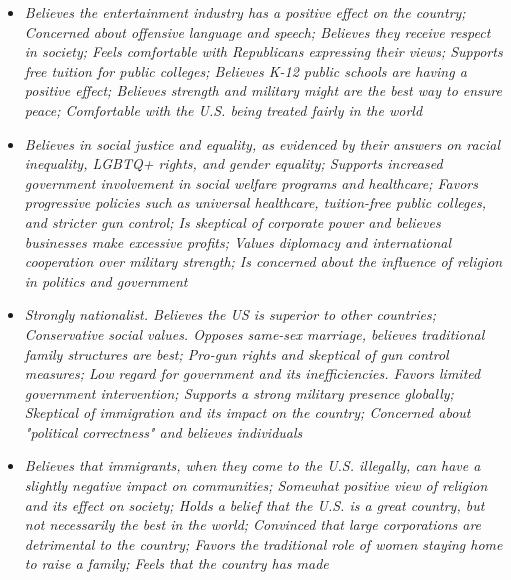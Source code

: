 \documentclass[11pt]{article}
\newcommand{\profiletext}[1]{\textit{#1}}
\begin{document}
\begin{itemize}
\item \profiletext{Believes the entertainment industry has a positive effect on the country; Concerned about offensive language and speech; Believes they receive respect in society; Feels comfortable with Republicans expressing their views; Supports free tuition for public colleges; Believes K-12 public schools are having a positive effect; Believes strength and military might are the best way to ensure peace; Comfortable with the U.S. being treated fairly in the world}
\item \profiletext{Believes in social justice and equality, as evidenced by their answers on racial inequality, LGBTQ+ rights, and gender equality; Supports increased government involvement in social welfare programs and healthcare; Favors progressive policies such as universal healthcare, tuition-free public colleges, and stricter gun control; Is skeptical of corporate power and believes businesses make excessive profits; Values diplomacy and international cooperation over military strength; Is concerned about the influence of religion in politics and government}
\item \profiletext{Strongly nationalist. Believes the US is superior to other countries; Conservative social values. Opposes same-sex marriage, believes traditional family structures are best; Pro-gun rights and skeptical of gun control measures; Low regard for government and its inefficiencies. Favors limited government intervention; Supports a strong military presence globally; Skeptical of immigration and its impact on the country; Concerned about "political correctness" and believes individuals}
\item \profiletext{Believes that immigrants, when they come to the U.S. illegally, can have a slightly negative impact on communities; Somewhat positive view of religion and its effect on society; Holds a belief that the U.S. is a great country, but not necessarily the best in the world; Convinced that large corporations are detrimental to the country; Favors the traditional role of women staying home to raise a family; Feels that the country has made}
\end{itemize}
\end{document}
